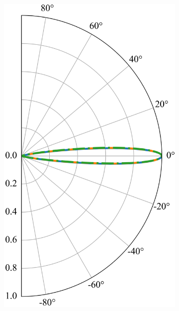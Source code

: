 \begin{figure}[H]
\begin{subfigure}[b]{0.3\linewidth}
            \includegraphics[width=\linewidth]{fig/tunneling shift/U0.07.png}
            \caption{}
            \label{fig:asym2}
        \end{subfigure}


\end{figure}
